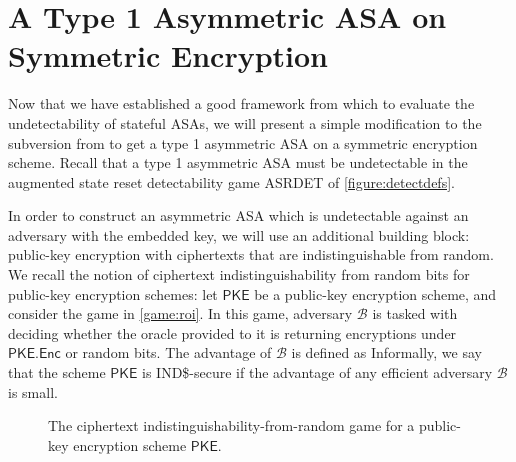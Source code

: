 \chapter{A Type 1 Asymmetric ASA on Symmetric Encryption} \label{sec:asymASA}
Now that we have established a good framework from which to evaluate the undetectability of stateful ASAs, we will present a simple modification to the subversion from \cite{C:BelPatRog14} to get a type 1 asymmetric ASA on a symmetric encryption scheme. Recall  that a type 1 asymmetric ASA must be undetectable in the augmented state reset detectability game ASRDET of \autoref{figure:detectdefs}.

In order to construct an asymmetric ASA which is undetectable against an adversary with the embedded key, we will use an additional building block: public-key encryption with ciphertexts that are indistinguishable from random. We recall the notion of ciphertext indistinguishability from random bits for public-key encryption schemes: let $\mathsf{PKE}$ be a public-key encryption scheme, and consider the game in \autoref{game:roi}. In this game, adversary $\mathcal{B}$ is tasked with deciding whether the oracle provided to it is returning encryptions under $\mathsf{PKE.Enc}$ or random bits. The advantage of $\mathcal{B}$ is defined as
Informally, we say that the scheme $\mathsf{PKE}$ is IND\$-secure if the advantage of any efficient adversary $\mathcal{B}$ is small.

\begin{figure}
\centering
\begin{pchstack}
\pchspace
{}
\end{pchstack}
\caption[The ciphertext indistinguishability-from-random game for a public-key encryption scheme]{The ciphertext indistinguishability-from-random game for a public-key encryption scheme $\mathsf{PKE}$.}
\label{game:roi}
\end{figure}

